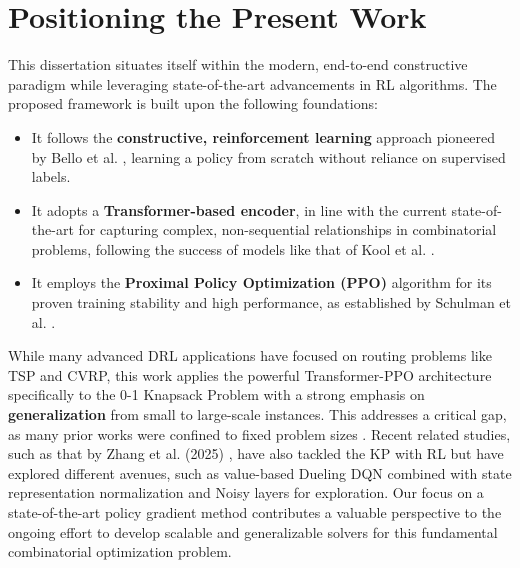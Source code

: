 \section{Positioning the Present Work}
This dissertation situates itself within the modern, end-to-end constructive paradigm while leveraging state-of-the-art advancements in RL algorithms. The proposed framework is built upon the following foundations:
\begin{itemize}
    \item It follows the \textbf{constructive, reinforcement learning} approach pioneered by Bello et al. \cite{belloNeuralCombinatorialOptimization2017}, learning a policy from scratch without reliance on supervised labels.
    \item It adopts a \textbf{Transformer-based encoder}, in line with the current state-of-the-art for capturing complex, non-sequential relationships in combinatorial problems, following the success of models like that of Kool et al. \cite{koolAttentionLearnSolve2019a}.
    \item It employs the \textbf{Proximal Policy Optimization (PPO)} algorithm for its proven training stability and high performance, as established by Schulman et al. \cite{schulmanProximalPolicyOptimization2017}.
\end{itemize}

While many advanced DRL applications have focused on routing problems like TSP and CVRP, this work applies the powerful Transformer-PPO architecture specifically to the 0-1 Knapsack Problem with a strong emphasis on \textbf{generalization} from small to large-scale instances. This addresses a critical gap, as many prior works were confined to fixed problem sizes \cite{belloNeuralCombinatorialOptimization2017}. Recent related studies, such as that by Zhang et al. (2025) \cite{zhangReinforcementLearningSolving2025}, have also tackled the KP with RL but have explored different avenues, such as value-based Dueling DQN combined with state representation normalization and Noisy layers for exploration. Our focus on a state-of-the-art policy gradient method contributes a valuable perspective to the ongoing effort to develop scalable and generalizable solvers for this fundamental combinatorial optimization problem.
